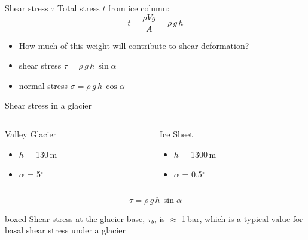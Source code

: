 \documentclass[hide notes,intlimits,unknownkeysallowed]{beamer}
\begin{document}
\begin{frame}{Shear stress $\tau$}
  Total stress $t$ from ice column:
    \begin{displaymath}
       t = \frac{\rho V g}{A} = \rho\,g\,h
     \end{displaymath}
     \begin{itemize}
     \item How much of this weight will contribute to shear deformation?
     \item shear stress $\tau = \rho\,g\,h\,\sin{\alpha}$
     \item normal stress $\sigma = \rho\,g\,h\,\cos{\alpha}$
    \end{itemize}
\end{frame}


\begin{frame}{Shear stress in a glacier}
\begin{columns}[c]
  \begin{column}{.5\textwidth}
    \begin{block}{Valley Glacier}
      \begin{itemize}
      \item $h$ = 130\,m
      \item $\alpha$ = 5$^{\circ}$
      \end{itemize}
    \end{block}
  \end{column}
  \begin{column}{.5\textwidth}
    \begin{block}{Ice Sheet}
  \begin{itemize}
  \item $h$ = 1300\,m
  \item $\alpha$ = 0.5$^{\circ}$
  \end{itemize}
\end{block}
\end{column}
\end{columns}
\vspace{1em}
\begin{displaymath}
    \tau = \rho\,g\,h\,\sin{\alpha}
  \end{displaymath}
  \begin{beamercolorbox}[rounded=true,shadow=true]{boxed}
    Shear stress at the glacier base, $\tau_{b}$, is $\approx$ 1\,bar, which is a typical value for basal shear stress under a glacier
  \end{beamercolorbox}
\end{frame}
   
\end{document}
